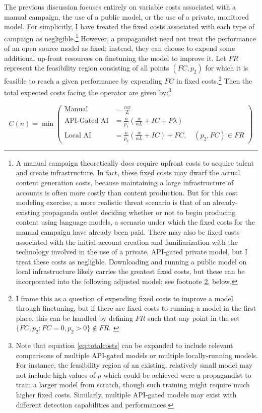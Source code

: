 \documentclass{article}
\begin{document}
The previous discussion focuses entirely on variable costs associated with a manual campaign, the use of a public model, or the use of a private, monitored model. For simplicitly, I have treated the fixed costs associated with each type of campaign as negligible.\footnote{A manual campaign theoretically does require upfront costs to acquire talent and create infrastructure. In fact, these fixed costs may dwarf the actual content generation costs, because maintaining a large infrastructure of accounts is often more costly than content production. But for this cost modeling exercise, a more realistic threat scenario is that of an already-existing propaganda outlet deciding whether or not to begin producing content using language models, a scenario under which the fixed costs for the manual campaign have already been paid. There may also be fixed costs associated with the initial account creation and familiarization with the technology involved in the use of a private, API-gated private model, but I treat these costs as negligble. Downloading and running a public model on local infrastructure likely carries the greatest fixed costs, but these can be incorporated into the following adjusted model; see footnote \ref{feasibilityset}, below.} However, a propagandist need not treat the performance of an open source model as fixed; instead, they can choose to expend some additional up-front resources on finetuning the model to improve it. Let $FR$ represent the feasibility region consisting of all points $(FC, p_2)$ for which it is feasible to reach a given performance by expending $FC$ in fixed costs.\footnote{I frame this as a question of expending fixed costs to improve a model through finetuning, but if there are fixed costs to running a model in the first place, this can be handled by defining $FR$ such that any point in the set $\{ FC, p_2 : FC = 0, p_2 > 0 \} \notin FR$. \label{feasibilityset}} Then the total expected costs facing the operator are given by:\footnote{Note that equation \ref{eq:totalcosts} can be expanded to include relevant comparisons of multiple API-gated models or multiple locally-running models. For instance, the feasibility region of an existing, relatively small model may not include high values of $p$ which could be achieved were a propagandist to train a larger model from scratch, though such training might require much higher fixed costs. Similarly, multiple API-gated models may exist with different detection capabilities and performances.}

\begin{equation}
  \label{eq:totalcosts}
  C(n) = \min \left(
  \begin{aligned}
    \text{Manual} &= \frac{nw}{L} \\
    \text{API-Gated AI} &= \frac{n}{p_{1}} \left( \frac{w}{\alpha L} + IC + P \lambda \right) \\
    \text{Local AI} &= \frac{n}{p_{2}} \left( \frac{w}{\alpha L} + IC \right) + FC, \quad (p_2, FC) \in FR
  \end{aligned}
  \right)
\end{equation}
\end{document}
